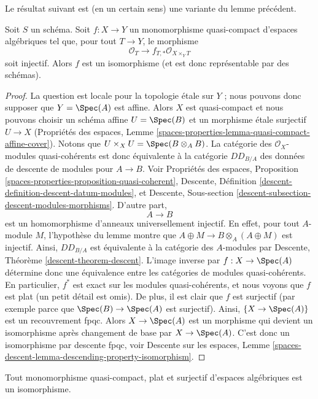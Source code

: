\noindent
Le résultat suivant est (en un certain sens) une variante du lemme précédent.

\begin{lemma}
\label{lemma-ui-case}
Soit $S$ un schéma. Soit $f : X \to Y$ un monomorphisme quasi-compact
d'espaces algébriques tel que, pour tout $T \to Y$, le morphisme
$$
\mathcal{O}_T \to f_{T,*}\mathcal{O}_{X \times_Y T}
$$
soit injectif. Alors $f$ est un isomorphisme (et est donc représentable par des schémas).
\end{lemma}

\begin{proof}
La question est locale pour la topologie étale sur $Y$ ; nous pouvons donc supposer que $Y = \Spec(A)$
est affine. Alors $X$ est quasi-compact et nous pouvons choisir un schéma affine
$U = \Spec(B)$ et un morphisme étale surjectif $U \to X$
(Propriétés des espaces, Lemme
\ref{spaces-properties-lemma-quasi-compact-affine-cover}).
Notons que $U \times_X U = \Spec(B \otimes_A B)$. La catégorie des
$\mathcal{O}_X$-modules quasi-cohérents est donc équivalente à la
catégorie $DD_{B/A}$ des données de descente de modules pour $A \to B$.
Voir Propriétés des espaces, Proposition
\ref{spaces-properties-proposition-quasi-coherent},
Descente, Définition \ref{descent-definition-descent-datum-modules}, et
Descente, Sous-section \ref{descent-subsection-descent-modules-morphisms}.
D'autre part,
$$
A \to B
$$
est un homomorphisme d'anneaux universellement injectif. En effet, pour tout
$A$-module $M$, l'hypothèse du lemme montre que $A \oplus M \to B \otimes_A (A \oplus M)$
est injectif. Ainsi,
$DD_{B/A}$ est équivalente à la catégorie des $A$-modules par
Descente, Théorème \ref{descent-theorem-descent}. L'image inverse par
$f : X \to \Spec(A)$ détermine donc une équivalence entre les catégories de
modules quasi-cohérents. En particulier, $f^*$ est exact sur les
modules quasi-cohérents, et nous voyons que $f$ est plat
(un petit détail est omis). De plus, il est clair que $f$ est surjectif
(par exemple parce que $\Spec(B) \to \Spec(A)$ est surjectif).
Ainsi, $\{X \to \Spec(A)\}$ est un recouvrement fpqc.
Alors $X \to \Spec(A)$ est un morphisme qui devient un isomorphisme
après changement de base par $X \to \Spec(A)$. C'est donc un isomorphisme par
descente fpqc, voir Descente sur les espaces, Lemme
\ref{spaces-descent-lemma-descending-property-isomorphism}.
\end{proof}

\begin{lemma}
\label{lemma-flat-surjective-monomorphism}
Tout monomorphisme quasi-compact, plat et surjectif d'espaces algébriques
est un isomorphisme.
\end{lemma}

